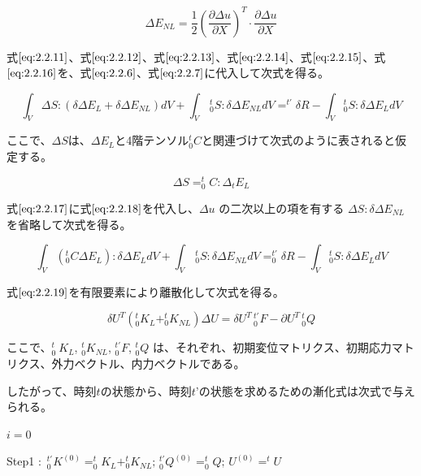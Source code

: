 \documentclass[a4paper,pandoc,ja=standard]{bxjsarticle}
\begin{document}
\begin{equation}
\Delta E_{NL} = \frac{1}{2}\left(\frac{\partial \Delta u}{\partial X}\right)^T\cdot\frac{\partial \Delta u}{\partial X}
\label{eq:2.2.16}
\end{equation}

式\(\eqref{eq:2.2.11}\)、式\(\eqref{eq:2.2.12}\)、式\(\eqref{eq:2.2.13}\)、式\(\eqref{eq:2.2.14}\)、式\(\eqref{eq:2.2.15}\)、式\(\eqref{eq:2.2.16}\)を、式\(\eqref{eq:2.2.6}\)、式\(\eqref{eq:2.2.7}\)に代入して次式を得る。

\begin{equation}
\int_{V} \Delta S: (\delta \Delta E_L + \delta \Delta E_{NL})dV + \int_{V}\,_0^{t} S : \delta \Delta E_{NL} dV = ^{t'} \delta R - \int_V{_0^t S} : \delta \Delta E_LdV
\label{eq:2.2.17}
\end{equation}

ここで、\(\Delta S\)は、\(\Delta E_L\)と4階テンソル\(^{t}_{0} C\)と関連づけて次式のように表されると仮定する。

\begin{equation}
\Delta S=^t_0 C:\Delta_t E_{L}
\label{eq:2.2.18}
\end{equation}

式\(\eqref{eq:2.2.17}\)に式\(\eqref{eq:2.2.18}\)を代入し、\(\Delta u\) の二次以上の項を有する \(\Delta S :\delta \Delta E_{NL}\) を省略して次式を得る。

\begin{equation}
\int_V ( ^t_{0}
C \Delta E_L ) : \delta \Delta E_L dV + \int_V\,^t_0 S : \delta \Delta E_{NL} dV = _0^{t'}\delta R - \int_V{_0^t S} : \delta \Delta E_{L} dV
\label{eq:2.2.19}
\end{equation}

式\(\eqref{eq:2.2.19}\)を有限要素により離散化して次式を得る。

\begin{equation}
\delta U^T ( ^t_0 K_L + ^t_0 K_{NL} ) \Delta U = \delta U^{T}\,_{0}^{t'} F - \partial U^T\,^t_{0} Q
\label{eq:2.2.20}
\end{equation}

ここで、\(^t_0\ K_L\), \(^t_0 K_{NL}\), \(_0^{t'} F\), \(^t_0 Q\) は、それぞれ、初期変位マトリクス、初期応力マトリクス、外力ベクトル、内力ベクトルである。

したがって、時刻\(t\)の状態から、時刻\(t’\)の状態を求めるための漸化式は次式で与えられる。

\(i = 0\)

Step1 :
\(\,^{t'}_0 K^{(0)}=^{t}_0 K_L+^{t}_0 K_{NL};\,^{t'}_0 Q^{(0)}=^{t}_0 Q;\, U^{(0)}=^{t} U\)
\end{document}
